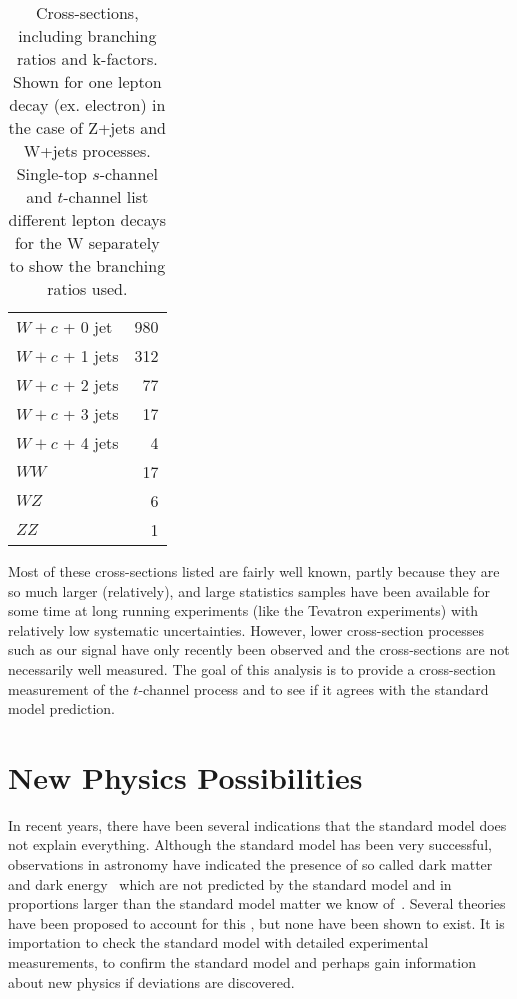 \begin{table}[htdp]
\begin{center}
\begin{tabular}{l|r}
\hline
$W+c$ + 0 jet   & 980 \\
$W+c$ + 1 jets  & 312 \\
$W+c$ + 2 jets  & 77  \\
$W+c$ + 3 jets  & 17  \\
$W+c$ + 4 jets  & 4  \\ 
\hline
$WW$                         & 17 \\
$WZ$                         & 6 \\
$ZZ$                         & 1 \\
\hline\hline
\end{tabular}
\caption{ Cross-sections, including branching ratios and k-factors. Shown for one lepton decay (ex. electron) in the case of Z+jets and W+jets processes.  Single-top $s$-channel and $t$-channel list different lepton decays for the W separately to show the branching ratios used.}
\label{TABLE-MCSAMPLES}
\end{center}
\end{table}

Most of these cross-sections listed are fairly well known, partly because they are so much larger (relatively), and large statistics samples have been available for some time at long running experiments (like the Tevatron experiments) with relatively low systematic uncertainties.  However, lower cross-section processes such as our signal have only recently been observed and the cross-sections are not necessarily well measured.  The goal of this analysis is to provide a cross-section measurement of the $t$-channel process and to see if it agrees with the standard model prediction.

\section{New Physics Possibilities}
In recent years, there have been several indications that the standard model does not explain everything.  Although the standard model has been very successful, observations in astronomy have indicated the presence of so called dark matter~\cite{DarkMatterReview} and dark energy~\cite{DarkEnergySN} which are not predicted by the standard model and in proportions larger than the standard model matter we know of~\cite{WMAP}.  Several theories have been proposed to account for this
, but none have been shown to exist.  It is importation to check the standard model with detailed experimental measurements, to confirm the standard model and perhaps gain information about new physics if deviations are discovered.


